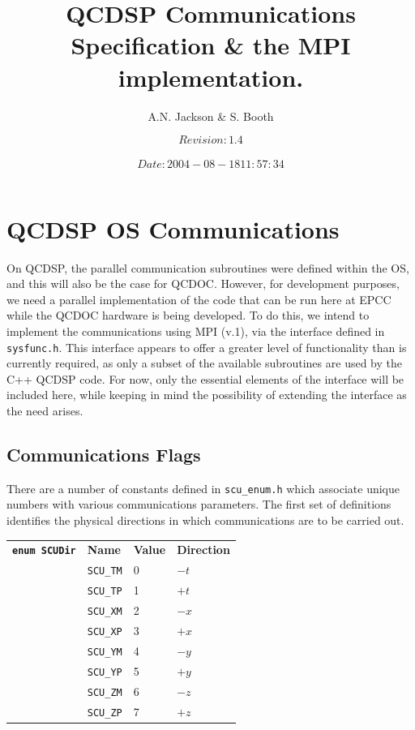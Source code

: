 \documentclass[12pt]{article}
\title{QCDSP Communications Specification \& the MPI implementation.}
\author{A.N. Jackson \& S. Booth}
\date{\mbox{\small $$Revision: 1.4 $$  $$Date: 2004-08-18 11:57:34 $$}}
\newcommand{\cde}[1]{{\tt #1}}            %
\begin{document}
\maketitle

\tableofcontents
\newpage

\section{QCDSP OS Communications}
On QCDSP, the parallel communication subroutines were defined within
the OS, and this will also be the case for QCDOC.  However, for
development purposes, we need a parallel implementation of the code
that can be run here at EPCC while the QCDOC hardware is being
developed.  To do this, we intend to implement the communications
using MPI (v.1), via the interface defined in \cde{sysfunc.h}.  This
interface appears to offer a greater level of functionality than is
currently required, as only a subset of the available subroutines are
used by the C++ QCDSP code.  For now, only the essential elements of
the interface will be included here, while keeping in mind the
possibility of extending the interface as the need arises.

\subsection{Communications Flags}
\label{col:comm:flags}
There are a number of constants defined in \cde{scu\_enum.h} which
associate unique numbers with various communications parameters.  The
first set of definitions identifies the physical directions in which
communications are to be carried out.

\begin{tabular}{llll}
\cde{{\bf enum SCUDir}} & {\bf Name} & {\bf Value} & {\bf Direction} \\
                        &\cde{SCU\_\-TM} & 0 & $-t$\\
                        &\cde{SCU\_\-TP} & 1 & $+t$\\
                        &\cde{SCU\_\-XM} & 2 & $-x$\\
                        &\cde{SCU\_\-XP} & 3 & $+x$\\
                        &\cde{SCU\_\-YM} & 4 & $-y$\\
                        &\cde{SCU\_\-YP} & 5 & $+y$\\
                        &\cde{SCU\_\-ZM} & 6 & $-z$\\
                        &\cde{SCU\_\-ZP} & 7 & $+z$
\end{tabular}
\end{document}
